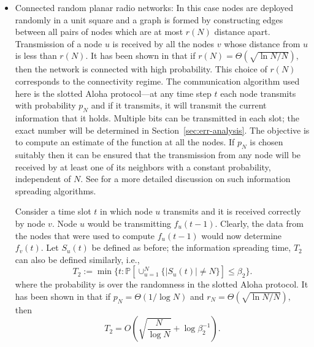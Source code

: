 \documentclass[10pt,twosided,a4paper,draft,onecolumn]{article}
\newcommand{\prob}[1]{\mathbb{P}\left[ #1 \right]}
\begin{document}
\begin{itemize}
\item Connected random planar radio networks: In this case nodes are
  deployed randomly in a unit square and a graph is formed by
  constructing edges between all pairs of nodes which are at most
  $r(N)$ distance apart. Transmission of a node $u$ is received by all
  the nodes $v$ whose distance from $u$ is less than $r(N).$ It has
  been shown in \cite{Gupta00,Penrose03} that if $r(N) = \Theta
  \left(\sqrt{\ln N/N}\right),$ then the network is connected with
  high probability. This choice of $r(N)$ corresponds to the
  connectivity regime. The communication algorithm used here is the
  slotted Aloha protocol---at any time step $t$ each node transmits
  with probability $p_N$ and if it transmits, it will transmit the
  current information that it holds. Multiple bits can be transmitted
  in each slot; the exact number will be determined in Section~\ref{sec:err-analysis}.
  The objective is to compute an estimate of the function at all the
  nodes. If $p_N$ is chosen suitably then it can be ensured that the
  transmission from any node will be received by at least one of its
  neighbors with a constant probability, independent of $N.$ See
  \cite{Kamath08} for a more detailed discussion on such information
  spreading algorithms.

  Consider a time slot $t$ in which node $u$ transmits and it is
  received correctly by node $v.$ Node $u$ would be transmitting
  $f_u(t-1).$ Clearly, the data from the nodes that were used to compute
  $f_u(t-1)$ would now determine $f_v(t).$ Let $S_u(t)$ be defined as
  before; the information spreading time, $T_2$ can also be defined
  similarly, i.e., 
\begin{displaymath}
    T_2 := \min \{t: \prob{ \cup_{u=1}^N \{ |S_u(t)| \neq N \}} \leq
    \beta_2 \}. 
  \end{displaymath}
where the probability is over the randomness in the slotted Aloha
  protocol. It has been shown in \cite{Kamath08} that if $p_N =
  \Theta(1/ \log N)$ and $r_N = \Theta \left(\sqrt{\ln N/N} \right),$
  then
\begin{displaymath}
    T_2 = O \left(\sqrt{\frac{N}{\log N}} + \log \beta_2^{-1} \right).
  \end{displaymath}


\end{itemize}
\end{document}
